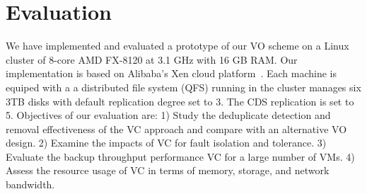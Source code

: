 
\section{Evaluation}
\label{sect:exper}

We have implemented and evaluated a prototype of our VO scheme on a Linux cluster
of 8-core AMD FX-8120 at 3.1 GHz with 16 GB RAM. 
Our implementation is based on Alibaba's Xen cloud platform~\cite{Aliyun,WeiZhangIEEE}.
Each machine  is equiped with a 
a distributed file system (QFS) running in the cluster manages six 3TB disks
with default replication degree set to 3. The CDS replication is set to 5.
Objectives of our evaluation are:
1) Study the deduplicate detection and removal effectiveness of the VC approach and compare with an alternative VO
design.
2) Examine the impacts of VC for fault isolation and tolerance. 
3) Evaluate the backup throughput performance VC  for a large number of VMs.
4) Assess the resource usage  of VC in terms of memory, storage, and network bandwidth.


